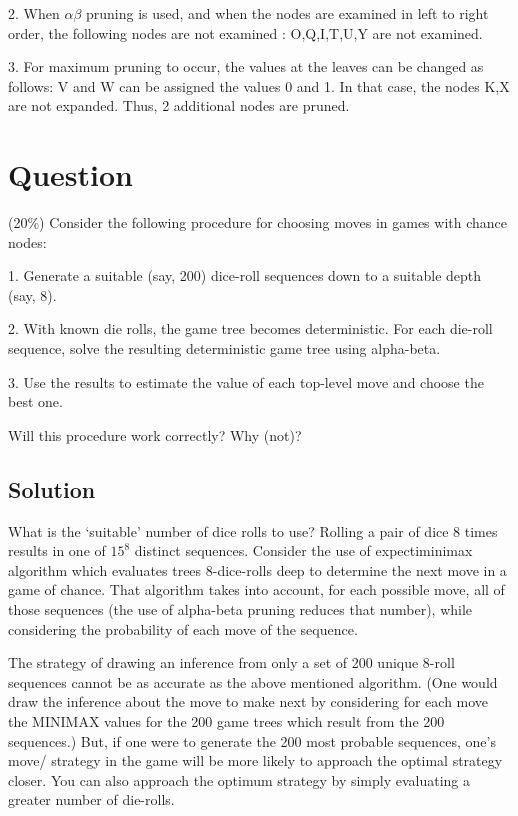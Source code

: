 \documentclass[a4paper,10pt]{article}
\begin{document}
2. When $\alpha\beta$ pruning is used, and when the nodes are examined in left to right order, the following nodes are not examined : O,Q,I,T,U,Y are not examined.

3. For maximum pruning to occur, the values at the leaves can be changed as follows: V and W can be assigned the values 0 and 1. In that case, the nodes K,X are not expanded. Thus, 2 additional nodes are pruned.

\section{Question}
 (20\%) Consider the following procedure for choosing moves in games with chance nodes:

   1. Generate a suitable (say, 200) dice-roll sequences down to a suitable depth (say, 8).

   2. With known die rolls, the game tree becomes deterministic. For each die-roll sequence, solve the resulting deterministic game tree using alpha-beta.

   3. Use the results to estimate the value of each top-level move and choose the best one. 

Will this procedure work correctly? Why (not)?

\subsection{Solution}

What is the `suitable' number of dice rolls to use? Rolling a pair of dice 8 times results in one of $15^{8}$ distinct sequences. Consider the use of expectiminimax algorithm which evaluates trees 8-dice-rolls deep to determine the next move in a game of chance. That algorithm takes into account, for each possible move, all of those sequences (the use of alpha-beta pruning reduces that number), while considering the probability of each move of the sequence.

The strategy of drawing an inference from only a set of 200 unique 8-roll sequences cannot be as accurate as the above mentioned algorithm. (One would draw the inference about the move to make next by considering for each move the MINIMAX values for the 200 game trees which result from the 200 sequences.) But, if one were to generate the 200 most probable sequences, one's move/ strategy in the game will be more likely to approach the optimal strategy closer. You can also approach the optimum strategy by simply evaluating a greater number of die-rolls.
\end{document}
